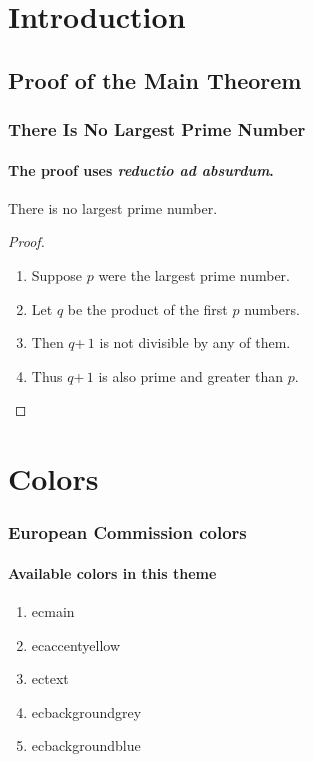 



\begin{frame}[plain]
  \titlepage
\end{frame}

\section{Introduction}
\subsection{Proof of the Main Theorem}

\begin{frame}
  \frametitle{There Is No Largest Prime Number}
  \framesubtitle{The proof uses \textit{reductio ad absurdum}.}

  \begin{theorem}
    There is no largest prime number.
  \end{theorem}
  \begin{proof}
    \begin{enumerate}
      \item<1-| alert@1> Suppose $p$ were the largest prime number.
      \item<2-> Let $q$ be the product of the first $p$ numbers.
      \item<3-> Then $q$\;+\,$1$ is not divisible by any of them.
      \item<4-> Thus $q$\;+\,$1$ is also prime and greater than $p$.\qedhere
    \end{enumerate}
  \end{proof}
\end{frame}

\section{Colors}

\begin{frame}
  \frametitle{European Commission colors}
  \framesubtitle{Available colors in this theme}

  \begin{enumerate}
    \item<1-> \color{ecmain}ecmain
    \item<2-> \color{ecaccentyellow}ecaccentyellow
    \item<3-> \color{ectext}ectext
    \item<4-> \color{ecbackgroundgrey}ecbackgroundgrey
    \item<5-> \color{ecbackgroundblue}ecbackgroundblue
  \end{enumerate}
\end{frame}


